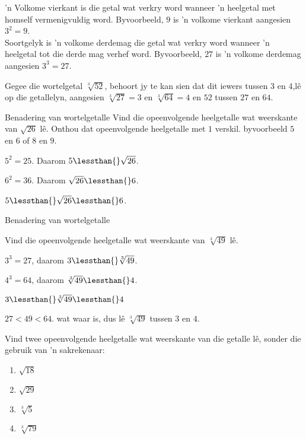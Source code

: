 ’n Volkome vierkant is die getal wat verkry word wanneer ’n heelgetal met homself vermenigvuldig word. Byvoorbeeld, $9$  is ’n volkome vierkant aangesien ${3}^{2}=9$. \\
Soortgelyk is ’n volkome derdemag die getal wat verkry word wanneer ’n heelgetal
tot die derde mag verhef word. Byvoorbeeld, $27$ is ’n volkome derdemag aangesien ${3}^{3}=27$.
\par 
Gegee die wortelgetal $\sqrt[3]{52}$, behoort jy te kan sien dat dit iewers tussen $3$ en $4$,lê op die getallelyn, aangesien $\sqrt[3]{27}=3$ en $\sqrt[3]{64}=4$ en $52$ tussen $27$ en $64$.

\begin{wex}{Benadering van wortelgetalle}
{
Vind die opeenvolgende heelgetalle wat weerskante van $\sqrt{26}$ lê.
Onthou dat opeenvolgende heelgetalle met $1$ verskil. byvoorbeeld $5$ en $6$ of $8$ en $9$.
}
{
           
${5}^{2}=25$. Daarom $5\lessthan{}\sqrt{26}$.

${6}^{2}=36$. 
Daarom $\sqrt{26}\lessthan{}6$.

$5\lessthan{}\sqrt{26}\lessthan{}6$. 
}
\end{wex}


\begin{wex}{Benadering van wortelgetalle }{

Vind die opeenvolgende heelgetalle wat weerskante van $\sqrt[3]{49}$ lê.
}
{
   ${3}^{3}=27$, daarom $3\lessthan{}\sqrt[3]{49}$.

 ${4}^{3}=64$, daarom $\sqrt[3]{49}\lessthan{}4$. 

$3\lessthan{}\sqrt[3]{49}\lessthan{}4$

$27<49<64$. wat waar is, dus lê $\sqrt[3]{49}$ tussen $3$ en $4$.
}
\end{wex}

\begin{exercises}{}
 {
Vind twee opeenvolgende heelgetalle wat weerskante van die getalle lê, sonder die gebruik van 'n sakrekenaar:
\begin{enumerate}[itemsep=5pt, label=\textbf{\arabic*}. ]
\item $\sqrt{18}$
\item $\sqrt{29}$
\item $\sqrt[3]{5}$
\item $\sqrt[3]{79}$

\end{enumerate}
}
\end{exercises}



